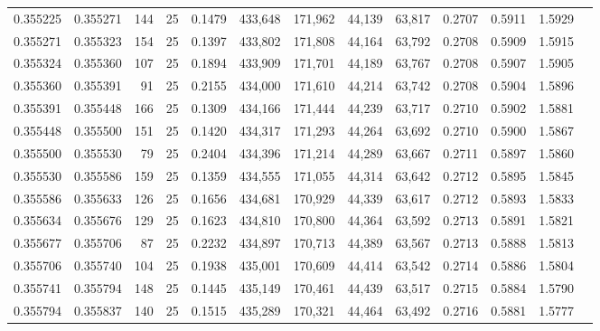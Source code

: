 \begin{tabular}{rrrrrrrrrrrrr}
0.355225 & 0.355271 &   144 &  25 &                                     0.1479 & 433,648 & 171,962 &  44,139 &  63,817 & 0.2707 & 0.5911 & 1.5929 \\
0.355271 & 0.355323 &   154 &  25 &                                     0.1397 & 433,802 & 171,808 &  44,164 &  63,792 & 0.2708 & 0.5909 & 1.5915 \\
0.355324 & 0.355360 &   107 &  25 &                                     0.1894 & 433,909 & 171,701 &  44,189 &  63,767 & 0.2708 & 0.5907 & 1.5905 \\
0.355360 & 0.355391 &    91 &  25 &                                     0.2155 & 434,000 & 171,610 &  44,214 &  63,742 & 0.2708 & 0.5904 & 1.5896 \\
0.355391 & 0.355448 &   166 &  25 &                                     0.1309 & 434,166 & 171,444 &  44,239 &  63,717 & 0.2710 & 0.5902 & 1.5881 \\
0.355448 & 0.355500 &   151 &  25 &                                     0.1420 & 434,317 & 171,293 &  44,264 &  63,692 & 0.2710 & 0.5900 & 1.5867 \\
0.355500 & 0.355530 &    79 &  25 &                                     0.2404 & 434,396 & 171,214 &  44,289 &  63,667 & 0.2711 & 0.5897 & 1.5860 \\
0.355530 & 0.355586 &   159 &  25 &                                     0.1359 & 434,555 & 171,055 &  44,314 &  63,642 & 0.2712 & 0.5895 & 1.5845 \\
0.355586 & 0.355633 &   126 &  25 &                                     0.1656 & 434,681 & 170,929 &  44,339 &  63,617 & 0.2712 & 0.5893 & 1.5833 \\
0.355634 & 0.355676 &   129 &  25 &                                     0.1623 & 434,810 & 170,800 &  44,364 &  63,592 & 0.2713 & 0.5891 & 1.5821 \\
0.355677 & 0.355706 &    87 &  25 &                                     0.2232 & 434,897 & 170,713 &  44,389 &  63,567 & 0.2713 & 0.5888 & 1.5813 \\
0.355706 & 0.355740 &   104 &  25 &                                     0.1938 & 435,001 & 170,609 &  44,414 &  63,542 & 0.2714 & 0.5886 & 1.5804 \\
0.355741 & 0.355794 &   148 &  25 &                                     0.1445 & 435,149 & 170,461 &  44,439 &  63,517 & 0.2715 & 0.5884 & 1.5790 \\
0.355794 & 0.355837 &   140 &  25 &                                     0.1515 & 435,289 & 170,321 &  44,464 &  63,492 & 0.2716 & 0.5881 & 1.5777 \\

\end{tabular}
